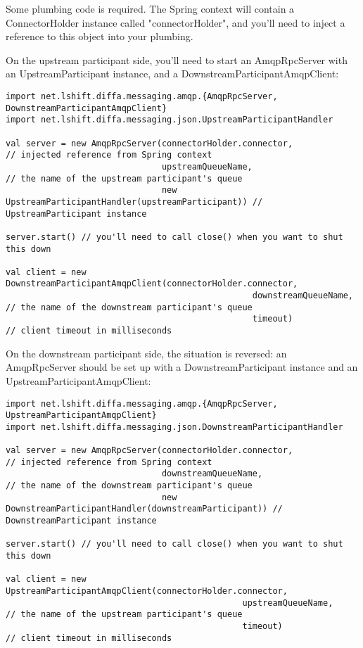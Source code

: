 Some plumbing code is required. The Spring context will contain a ConnectorHolder instance called "connectorHolder", and you'll
need to inject a reference to this object into your plumbing.

On the upstream participant side, you'll need to start an AmqpRpcServer with an UpstreamParticipant instance,
and a DownstreamParticipantAmqpClient:

\begin{lstlisting}
import net.lshift.diffa.messaging.amqp.{AmqpRpcServer, DownstreamParticipantAmqpClient}
import net.lshift.diffa.messaging.json.UpstreamParticipantHandler

val server = new AmqpRpcServer(connectorHolder.connector,             // injected reference from Spring context
                               upstreamQueueName,                     // the name of the upstream participant's queue
                               new UpstreamParticipantHandler(upstreamParticipant)) // UpstreamParticipant instance

server.start() // you'll need to call close() when you want to shut this down

val client = new DownstreamParticipantAmqpClient(connectorHolder.connector,
                                                 downstreamQueueName, // the name of the downstream participant's queue
                                                 timeout)             // client timeout in milliseconds
\end{lstlisting}

On the downstream participant side, the situation is reversed: an AmqpRpcServer should be set up with a
DownstreamParticipant instance and an UpstreamParticipantAmqpClient:

\begin{lstlisting}
import net.lshift.diffa.messaging.amqp.{AmqpRpcServer, UpstreamParticipantAmqpClient}
import net.lshift.diffa.messaging.json.DownstreamParticipantHandler

val server = new AmqpRpcServer(connectorHolder.connector,             // injected reference from Spring context
                               downstreamQueueName,                   // the name of the downstream participant's queue
                               new DownstreamParticipantHandler(downstreamParticipant)) // DownstreamParticipant instance

server.start() // you'll need to call close() when you want to shut this down

val client = new UpstreamParticipantAmqpClient(connectorHolder.connector,
                                               upstreamQueueName,     // the name of the upstream participant's queue
                                               timeout)               // client timeout in milliseconds
\end{lstlisting}

